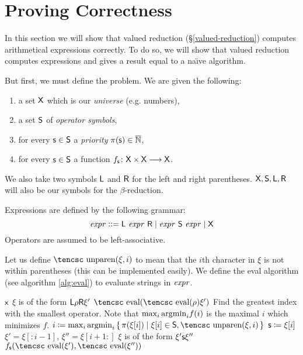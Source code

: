 \documentclass{llncs}
\newcounter{algo}
\begin{document}
\section{Proving Correctness}

\def\eval{\hbox{\tencsc eval}}
\def\unparen{\hbox{\tencsc unparen}}

In this section we will show that valued reduction (\S\ref{valued-reduction}) computes arithmetical expressions correctly.
To do so, we will show that valued reduction computes expressions and gives a result equal to a na\"\i ve algorithm.

But first, we must define the problem.
We are given the following:
\begin{enumerate}
    \item a set $\mathsf{X}$ which is our \textit{universe} (e.g. numbers),
    \item a set $\mathsf{S}$ of \textit{operator symbols},
    \item for every $\mathsf{s}\in\mathsf{S}$ a \textit{priority} $\pi(\mathsf{s})\in\overline{\mathbb N}$,
    \item for every $\mathsf{s}\in\mathsf{S}$ a function $f_{\mathsf{s}}\colon\mathsf{X}\times\mathsf{X}\longrightarrow\mathsf{X}$.
\end{enumerate}
We also take two symbols $\mathsf{L}$ and $\mathsf{R}$ for the left and right parentheses.
$\mathsf{X},\mathsf{S},\mathsf{L},\mathsf{R}$ will also be our symbols for the $\beta$-reduction.

Expressions are defined by the following grammar:
\[ {\it expr} \mathrel{{\mathop:}{\mathop:}{=}} \mathsf{L}\ {\it expr}\ \mathsf{R}  \mid {\it expr}\ \mathsf{S}\ {\it expr} \mid \mathsf{X} \]
Operators are assumed to be left-associative.

Let us define $\unparen(\xi,i)$ to mean that the $i$th character in $\xi$ is not within parentheses (this can be implemented easily).
We define the \eval{} algorithm (see algorithm \ref{alg:eval}) to evaluate strings in ${\it expr}$.

\begin{algo}\label{alg:eval}
\caption{\eval uating arithmetical expressions}
\algorithm
{}
        \State\Return $\mathsf{x}$
        \State $\xi$ is of the form $\mathsf{L}\rho\mathsf{R}\xi'$
        \State\Return $\eval(\eval(\rho)\xi')$
    \Else
        \Comment Find the greatest index with the smallest operator.\cr
        Note that $\max_i{\rm argmin}_if(i)$ is the maximal $i$ which minimizes $f$.\EndComment
        \State $i\coloneqq\max_i{\rm argmin}_i\set{\pi(\xi[i])}[{\xi[i]\in\s S,\unparen(\xi,i)}]$
        \State $\mathsf{s}\coloneqq\xi[i]$
        \Comment $\xi'=\xi[:i-1]$, $\xi''=\xi[i+1:]$ \EndComment
        \State $\xi$ is of the form $\xi'\mathsf{s}\xi''$
        \State\Return $f_{\s s}(\eval(\xi'),\eval(\xi''))$
    \EndIf
\EndFunc
\ealgorithm
\end{algo}
\end{document}
